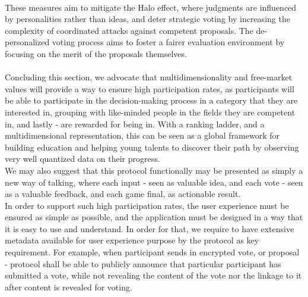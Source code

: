\documentclass{article}
\begin{document}
\begin{CJK}{UTF8}{gbsn}
\begin{multicols}{2}
        \paragraph{}

        These measures aim to mitigate the Halo effect, where judgments are influenced by personalities rather than ideas, and deter strategic voting by increasing the complexity of coordinated attacks against competent proposals. The de-personalized voting process aims to foster a fairer evaluation environment by focusing on the merit of the proposals themselves.

        \paragraph{}

        Concluding this section, we advocate that multidimensionality and free-market values will provide a way to ensure high participation rates, as participants will be able to participate in the decision-making process in a category that they are interested in, grouping with like-minded people in the fields they are competent in, and lastly - are rewarded for being in.
        With a ranking ladder, and a multidimensional representation, this can be seen as a global framework for building education and helping young talents to discover their path by observing very well quantized data on their progress. \\ We may also suggest that this protocol functionally may be presented as simply a new way of talking, where each input - seen as valuable idea, and each vote - seen as a valuable feedback, and each game final, as actionable result.\\
        In order to support such high participation rates, the user experience must be ensured as simple as possible, and the application must be designed in a way that it is easy to use and understand. In order for that, we require to have extensive metadata available for user experience purpose by the protocol as key requirement. For example, when participant sends in encrypted vote, or proposal - protocol shall be able to publicly announce that particular participant has submitted a vote, while not revealing the content of the vote nor the linkage to it after content is revealed for voting.\\






\end{multicols}
\end{CJK}
\end{document}
